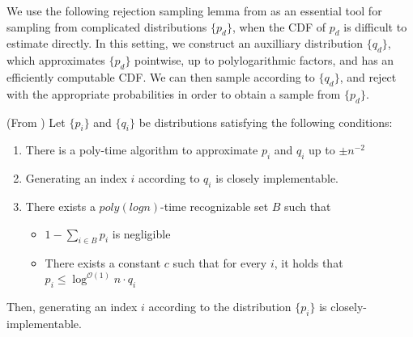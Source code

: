 We use the following rejection sampling lemma from \cite{huge} as an essential tool for sampling from complicated distributions $\{p_d\}$,
when the CDF of $p_d$ is difficult to estimate directly.
In this setting, we construct an auxilliary distribution $\{q_d\}$, which approximates $\{p_d\}$ pointwise, up to polylogarithmic factors,
and has an efficiently computable CDF.
We can then sample according to $\{q_d\}$, and reject with the appropriate probabilities in order to obtain a sample from $\{p_d\}$.
\begin{lemma}
\label{lem:rejection_sampling} (From \cite{huge})
Let $\{p_i\}$ and $\{q_i\}$ be distributions satisfying the following conditions:
\begin{enumerate}
    \item There is a poly-time algorithm to approximate $p_i$ and $q_i$ up to $\pm n^{-2}$
    \item Generating an index $i$ according to $q_i$ is closely implementable.
    \item There exists a $poly(log n)$-time recognizable set $B$ such that
    \begin{itemize}
        \item $1-\sum\limits_{i\in B} p_i$ is negligible
        \item There exists a constant $c$ such that for every $i$, it holds that $p_i\le \log^{\mathcal{O}(1)} n\cdot q_i$
    \end{itemize}
\end{enumerate}
Then, generating an index $i$ according to the distribution $\{p_i\}$ is closely-implementable.
\end{lemma}






